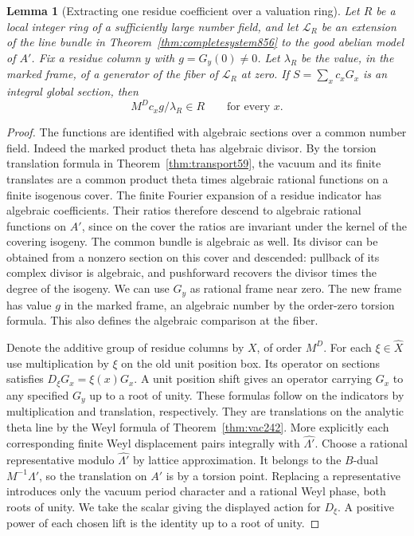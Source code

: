 \documentclass[a4paper,11pt]{article}
\newtheorem{lemma}[proposition]{Lemma}
\theoremstyle{definition}
\theoremstyle{remark}
\numberwithin{equation}{section}
\begin{document}
\begin{lemma}[Extracting one residue coefficient over a valuation ring]
\leavevmode\label{lem:residuecoeff857}
Let \(R\) be a local integer ring of a sufficiently large number
field, and let \(\mathcal L_R\) be an extension of the line bundle
in Theorem~\ref{thm:completesystem856} to the good abelian model
of \(A'\). Fix a residue column \(y\) with \(g=G_y(0)\ne0\).
Let \(\lambda_R\) be the value, in the marked frame, of a generator
of the fiber of \(\mathcal L_R\) at zero. If
\(S=\sum_x c_xG_x\) is an integral global section, then
\[
                  M^D c_x g/\lambda_R\in R\qquad\text{for every }x .
\]
\end{lemma}
\begin{proof}
The functions are identified with algebraic sections over a
common number field. Indeed the marked product theta has
algebraic divisor. By the torsion translation formula in
Theorem~\ref{thm:transport59}, the vacuum and its finite
translates are a common product theta times algebraic rational
functions on a finite isogenous cover. The finite Fourier
expansion of a residue indicator has algebraic coefficients.
Their ratios therefore descend to algebraic rational functions
on \(A'\), since on the cover the ratios are invariant under the
kernel of the covering isogeny. The common bundle is algebraic
as well. Its divisor can be obtained from a nonzero section
on this cover and descended: pullback of its complex divisor
is algebraic, and pushforward recovers the divisor times the
degree of the isogeny. We can use \(G_y\) as rational frame
near zero. The new frame has value \(g\) in the marked frame,
an algebraic number by the order-zero torsion formula. This
also defines the algebraic comparison at the fiber.

Denote the additive group of residue columns by \(X\), of order
\(M^D\). For each \(\xi\in\widehat X\) use multiplication by
\(\xi\) on the old unit position box. Its operator on sections
satisfies \(D_\xi G_x=\xi(x)G_x\). A unit position shift
gives an operator carrying \(G_x\) to any specified \(G_y\)
up to a root of unity. These formulas follow on the indicators
by multiplication and translation, respectively. They are
translations on the analytic theta line by the Weyl formula
of Theorem~\ref{thm:vac242}. More explicitly each corresponding
finite Weyl displacement pairs integrally with
\(\widehat{\Lambda'}\). Choose a rational representative modulo
\(\widehat{\Lambda'}\) by lattice approximation. It belongs
to the \(B\)-dual \(M^{-1}\Lambda'\), so the translation on
\(A'\) is by a torsion point. Replacing a representative
introduces only the vacuum period character and a rational
Weyl phase, both roots of unity. We take the scalar giving
the displayed action for \(D_\xi\). A positive power of each
chosen lift is the identity up to a root of unity.


\end{proof}
\end{document}
